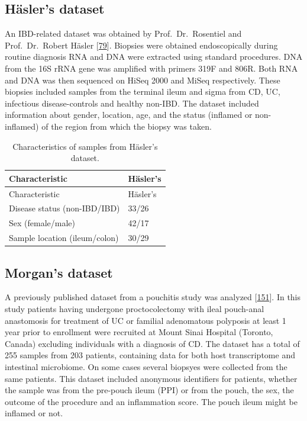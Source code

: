 \documentclass[
  a4paper,
]{book}
\begin{document}
\hypertarget{methods-hasler}{%
\subsection{Häsler's dataset}\label{methods-hasler}}

An IBD-related dataset was obtained by Prof.~Dr.~Rosentiel and Prof.~Dr.~Robert Häsler {[}\protect\hyperlink{ref-hasler_uncoupling_2016}{79}{]}.
Biopsies were obtained endoscopically during routine diagnosis RNA and DNA were extracted using standard procedures.
DNA from the 16S rRNA gene was amplified with primers 319F and 806R.
Both RNA and DNA was then sequenced on HiSeq 2000 and MiSeq respectively.
These biopsies included samples from the terminal ileum and sigma from CD, UC, infectious disease-controls and healthy non-IBD.
The dataset included information about gender, location, age, and the status (inflamed or non-inflamed) of the region from which the biopsy was taken.

\begin{longtable}[]{@{}ll@{}}
\caption{\label{tab:Hasler} Characteristics of samples from Häsler's dataset.}\tabularnewline
\toprule
Characteristic & Häsler's \\
\midrule
\endfirsthead
\toprule
Characteristic & Häsler's \\
\midrule
\endhead
Disease status (non-IBD/IBD) & 33/26 \\
Sex (female/male) & 42/17 \\
Sample location (ileum/colon) & 30/29 \\
\bottomrule
\end{longtable}

\hypertarget{methods-morgan}{%
\subsection{Morgan's dataset}\label{methods-morgan}}

A previously published dataset from a pouchitis study was analyzed {[}\protect\hyperlink{ref-morgan2015}{151}{]}.
In this study patients having undergone proctocolectomy with ileal pouch-anal anastomosis for treatment of UC or familial adenomatous polyposis at least 1 year prior to enrollment were recruited at Mount Sinai Hospital (Toronto, Canada) excluding individuals with a diagnosis of CD.
The dataset has a total of 255 samples from 203 patients, containing data for both host transcriptome and intestinal microbiome.
On some cases several biopsyes were collected from the same patients.
This dataset included anonymous identifiers for patients, whether the sample was from the pre-pouch ileum (PPI) or from the pouch, the sex, the outcome of the procedure and an inflammation score.
The pouch ileum might be inflamed or not.
\end{document}
